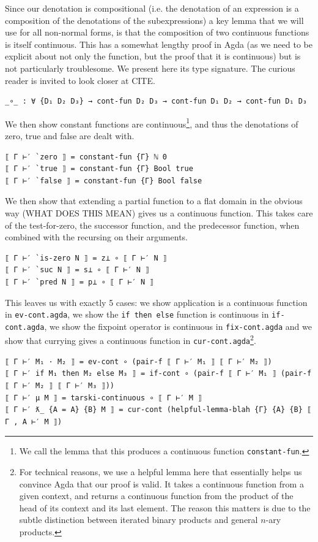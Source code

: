 \documentclass[12pt,a4paper,twoside,openright]{report}
\begin{document}
Since our denotation is compositional (i.e. the denotation of an expression is a composition of the denotations of the subexpressions) a key lemma that we will use for all non-normal forms, is that the composition of two continuous functions is itself continuous. This has a somewhat lengthy proof in Agda (as we need to be explicit about not only the function, but the proof that it is continuous) but is not particularly troublesome. We present here its type signature. The curious reader is invited to look closer at CITE.
\begin{verbatim}
_∘_ : ∀ {D₁ D₂ D₃} → cont-fun D₂ D₃ → cont-fun D₁ D₂ → cont-fun D₁ D₃
\end{verbatim}

We then show constant functions are continuous\footnote{We call the lemma that this produces a continuous function \texttt{constant-fun}.}, and thus the denotations of zero, true and false are dealt with. 
\begin{verbatim}
⟦ Γ ⊢′ `zero ⟧ = constant-fun {Γ} ℕ 0
⟦ Γ ⊢′ `true ⟧ = constant-fun {Γ} Bool true
⟦ Γ ⊢′ `false ⟧ = constant-fun {Γ} Bool false
\end{verbatim}
We then show that extending a partial function to a flat domain in the obvious way (WHAT DOES THIS MEAN) gives us a continuous function. This takes care of the test-for-zero, the successor function, and the predecessor function, when combined with the recursing on their arguments. 
\begin{verbatim}
⟦ Γ ⊢′ `is-zero N ⟧ = z⊥ ∘ ⟦ Γ ⊢′ N ⟧
⟦ Γ ⊢′ `suc N ⟧ = s⊥ ∘ ⟦ Γ ⊢′ N ⟧
⟦ Γ ⊢′ `pred N ⟧ = p⊥ ∘ ⟦ Γ ⊢′ N ⟧
\end{verbatim}
This leaves us with exactly 5 cases: we show application is a continuous function in \texttt{ev-cont.agda}, we show the \texttt{if then else} function is continuous in \texttt{if-cont.agda}, we show the fixpoint operator is continuous in \texttt{fix-cont.agda} and we show that currying gives a continuous function in \texttt{cur-cont.agda}\footnote{For technical reasons, we use a helpful lemma here that essentially helps us convince Agda that our proof is valid. It takes a continuous function from a given context, and returns a continuous function from the product of the head of its context and its last element. The reason this matters is due to the subtle distinction between iterated binary products and general $n$-ary products.}.
\begin{verbatim}
⟦ Γ ⊢′ M₁ · M₂ ⟧ = ev-cont ∘ (pair-f ⟦ Γ ⊢′ M₁ ⟧ ⟦ Γ ⊢′ M₂ ⟧) 
⟦ Γ ⊢′ if M₁ then M₂ else M₃ ⟧ = if-cont ∘ (pair-f ⟦ Γ ⊢′ M₁ ⟧ (pair-f ⟦ Γ ⊢′ M₂ ⟧ ⟦ Γ ⊢′ M₃ ⟧))
⟦ Γ ⊢′ μ M ⟧ = tarski-continuous ∘ ⟦ Γ ⊢′ M ⟧ 
⟦ Γ ⊢′ ƛ_ {A = A} {B} M ⟧ = cur-cont (helpful-lemma-blah {Γ} {A} {B} ⟦ Γ , A ⊢′ M ⟧)
\end{verbatim}
\end{document}
